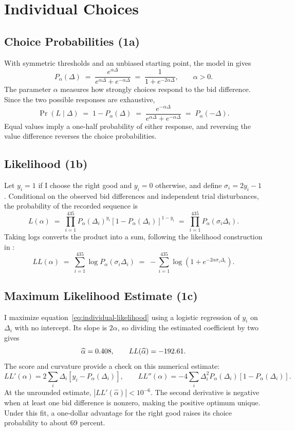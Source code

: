 \section{Individual Choices}
\label{sec:individual-choices}

\subsection{Choice Probabilities (1a)}
With symmetric thresholds and an unbiased starting point, the model in
\textcite[slide 10]{woodford2026ddm} gives
\begin{equation}\label{eq:choice-probability}
  P_\alpha(\Delta)
  \;=\; \frac{e^{\alpha\Delta}}{e^{\alpha\Delta}+e^{-\alpha\Delta}}
  \;=\; \frac{1}{1+e^{-2\alpha\Delta}}, \qquad \alpha>0.
\end{equation}
The parameter $\alpha$ measures how strongly choices respond to the bid
difference. Since the two possible responses are exhaustive,
\[
  \Pr(L\mid\Delta)
  \;=\; 1-P_\alpha(\Delta)
  \;=\; \frac{e^{-\alpha\Delta}}{e^{\alpha\Delta}+e^{-\alpha\Delta}}
  \;=\; P_\alpha(-\Delta).
\]
Equal values imply a one-half probability of either response, and
reversing the value difference reverses the choice probabilities.

\subsection{Likelihood (1b)}
Let $y_i=1$ if I choose the right good and $y_i=0$ otherwise, and define
$\sigma_i=2y_i-1$. Conditional on the observed bid differences and independent
trial disturbances, the probability of the recorded sequence is
\[
  L(\alpha)
  \;=\; \prod_{i=1}^{435}
       P_\alpha(\Delta_i)^{y_i}
       [1-P_\alpha(\Delta_i)]^{1-y_i}
  \;=\; \prod_{i=1}^{435}P_\alpha(\sigma_i\Delta_i).
\]
Taking logs converts the product into a sum, following the likelihood
construction in \textcite[pp.\ 4--5]{souther2026mle}:
\begin{equation}\label{eq:individual-likelihood}
  LL(\alpha)
  \;=\; \sum_{i=1}^{435}\log P_\alpha(\sigma_i\Delta_i)
  \;=\; -\sum_{i=1}^{435}\log\!\left(1+e^{-2\alpha\sigma_i\Delta_i}\right).
\end{equation}

\subsection{Maximum Likelihood Estimate (1c)}
I maximize equation~\eqref{eq:individual-likelihood} using a logistic
regression of $y_i$ on $\Delta_i$ with no intercept. Its slope is $2\alpha$,
so dividing the estimated coefficient by two gives
\[
  \widehat{\alpha}=0.408,
  \qquad LL(\widehat{\alpha})=-192.61.
\]
The score and curvature provide a check on this numerical estimate:
\[
  LL'(\alpha)=2\sum_i\Delta_i[y_i-P_\alpha(\Delta_i)],
  \qquad
  LL''(\alpha)=-4\sum_i\Delta_i^2P_\alpha(\Delta_i)
                         [1-P_\alpha(\Delta_i)].
\]
At the unrounded estimate, $|LL'(\widehat\alpha)|<10^{-6}$.
The second derivative is negative when at least one bid difference is nonzero,
making the positive optimum unique. Under this fit, a one-dollar advantage
for the right good raises its choice probability to about 69 percent.

